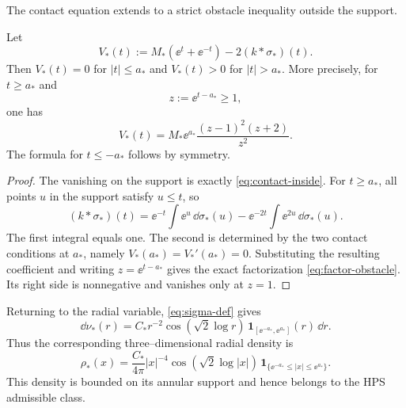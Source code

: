 The contact equation extends to a strict obstacle inequality outside the support.

\begin{proposition}
Let
\[
 V_*(t):=M_*(\ee^t+\ee^{-t})-2(k*\sigma_*)(t).
\]
Then $V_*(t)=0$ for $|t|\le a_*$ and $V_*(t)>0$ for $|t|>a_*$.  More precisely, for $t\ge a_*$ and
\[
 z:=\ee^{t-a_*}\ge1,
\]
one has
\begin{equation}\label{eq:factor-obstacle}
 \boxed{\displaystyle
 V_*(t)=M_*\ee^{a_*}\frac{(z-1)^2(z+2)}{z^2}.}
\end{equation}
The formula for $t\le-a_*$ follows by symmetry.
\end{proposition}

\begin{proof}
The vanishing on the support is exactly \eqref{eq:contact-inside}.  For $t\ge a_*$, all points $u$ in the support satisfy $u\le t$, so
\[
 (k*\sigma_*)(t)
 =\ee^{-t}\int\ee^u\,\dd\sigma_*(u)
 -\ee^{-2t}\int\ee^{2u}\,\dd\sigma_*(u).
\]
The first integral equals one.  The second is determined by the two contact conditions at $a_*$, namely $V_*(a_*)=V_*'(a_*)=0$.  Substituting the resulting coefficient and writing $z=\ee^{t-a_*}$ gives the exact factorization \eqref{eq:factor-obstacle}.  Its right side is nonnegative and vanishes only at $z=1$.
\end{proof}

Returning to the radial variable, \eqref{eq:sigma-def} gives
\begin{equation}\label{eq:nu-star}
 \dd\nu_*(r)
 =C_*r^{-2}\cos(\sqrt2\log r)\,
 \mathbf 1_{[\ee^{-a_*},\ee^{a_*}]}(r)\,\dd r.
\end{equation}
Thus the corresponding three--dimensional radial density is
\begin{equation}\label{eq:rho-star}
 \rho_*(x)
 =\frac{C_*}{4\pi}|x|^{-4}
 \cos(\sqrt2\log|x|)\,
 \mathbf 1_{\{\ee^{-a_*}\le|x|\le\ee^{a_*}\}}.
\end{equation}
This density is bounded on its annular support and hence belongs to the HPS admissible class.
